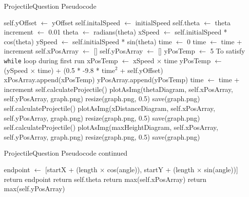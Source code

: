 \begin{algorithm}[h]
\label{projectilequestionps}
\caption{ProjectileQuestion Pseudocode}
\begin{algorithmic}[1]
	 {}
	\State self.yOffset $\gets$ yOffset
	\State self.initalSpeed $\gets$ initialSpeed
	\State self.theta $\gets$ theta
	\EndFunction
	\State increment $\gets$ 0.01
	\State theta $\gets$ radians(theta)
	\State xSpeed $\gets$ self.initialSpeed * cos(theta)
	\State ySpeed $\gets$ self.initialSpeed * sin(theta)
	\State time $\gets$ 0
	\State time $\gets$ time + increment
	\State self.xPosArray $\gets$ []
	\State self.yPosArray $\gets$ []
	\State yPosTemp $\gets$ 5 \Comment To satisfy \texttt{while} loop during first run
		\State xPosTemp $\gets$ xSpeed $\times$ time
		\State yPosTemp $\gets$ (ySpeed $\times$ time) + (0.5 * -9.8 * $\textrm{time}^2$ + self.yOffset) 
		\State xPosArray.append(xPosTemp)
		\State yPosArray.append(yPosTemp)
		\State time $\gets$ time + increment
	\EndWhile
	\EndFunction
	\State self.calculateProjectile()
	\State plotAsImg(thetaDiagram, self.xPosArray, self.yPosArray, graph.png)
	\State resize(graph.png, 0.5)
	\State save(graph.png)
	\EndFunction
	\State self.calculateProjectile()
	\State plotAsImg(xDistanceDiagram, self.xPosArray, self.yPosArray, graph.png)
	\State resize(graph.png, 0.5)
	\State save(graph.png)
	\EndFunction
	\State self.calculateProjectile()
	\State plotAsImg(maxHeightDiagram, self.xPosArray, self.yPosArray, graph.png)
	\State resize(graph.png, 0.5)
	\State save(graph.png)
	\EndFunction
	
\end{algorithmic}
\end{algorithm}
\clearpage
\begin{algorithm}[h]
\caption{ProjectileQuestion Pseudocode continued}
\begin{algorithmic}[1]
	\State endpoint $\gets$ [startX + (length $\times$ cos(angle)), startY + (length $\times$ sin(angle))]
	\State return endpoint
	\EndFunction
	\State return self.theta
	\EndFunction 
	\State return max(self.xPosArray)
	\EndFunction
	\State return max(self.yPosArray)
	\EndFunction
	\EndProcedure
\end{algorithmic}
\end{algorithm}
